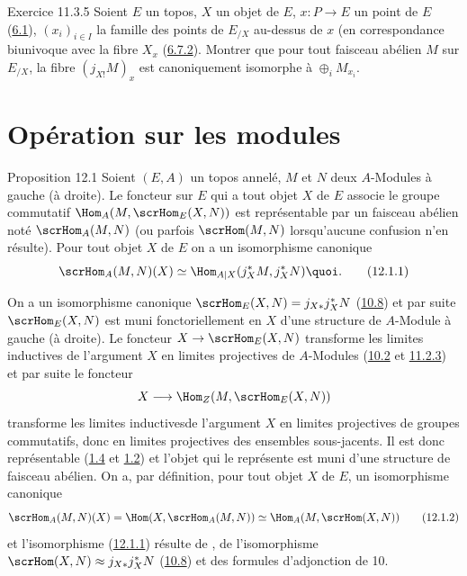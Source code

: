 \begin{enonce*}[remark]{Exercice 11.3.5}
Soient $E$ un topos, $X$ un objet de $E$, $x:P\rightarrow E$ un
point de $E$ (\hyperref[IV.def6.1]{6.1}), $(x_i)_{i\in I}$ la famille des
points de $E_{/X}$ au-dessus de $x$ (en correspondance biunivoque
avec la fibre $X_x$ (\hyperref[IV.eq6.7.2]{6.7.2}). Montrer que pour tout
faisceau abélien $M$ sur $E_{/X}$, la fibre $(j_{X!}M)_x$ est
canoniquement isomorphe à $\oplus_i M_{x_i}$.
\end{enonce*}

\section{Opération sur les modules}

\begin{enonce*}{Proposition 12.1}
Soient $(E,A)$ un topos annelé, $M$ et $N$ deux $A$-Modules à gauche
(\resp à droite). Le foncteur sur $E$ qui a tout objet $X$ de $E$
associe le groupe commutatif $\Hom_A(M,\scrHom_E(X,N))$ est
représentable par un faisceau abélien noté $\scrHom_A(M,N)$ (ou
parfois $\scrHom(M,N)$ lorsqu'aucune confusion n'en résulte). Pour
tout objet $X$ de $E$ on a un isomorphisme canonique
\begin{equation*}
\scrHom_A(M,N)(X)\simeq \Hom_{A| X}(j^{\ast}_XM,
j^{\ast}_XN){\quoi}.\tag{12.1.1}
\end{equation*}
\end{enonce*}

On a un isomorphisme canonique $\scrHom_E(X,N)=j_{X\ast}j^{\ast}_XN$
(\hyperref[IV.cor10.8]{10.8}) et par suite $\scrHom_E(X,N)$ est muni
fonctoriellement en $X$ d'une structure de $A$-Module à gauche
(\resp à droite). Le foncteur $X\rightarrow \scrHom_E(X,N)$
transforme les limites inductives de l'argument $X$ en limites
projectives de $A$-Modules (\hyperref[IV.subsec10.2]{10.2} et
\hyperref[IV.subsubsec11.2.3]{11.2.3}) et par suite le foncteur
$$
X\longrightarrow \Hom_Z(M,\scrHom_E(X,N))
$$
transforme les limites inductives\pageoriginale de l'argument $X$ en
limites projectives de groupes commutatifs, donc en limites
projectives des ensembles sous-jacents. Il est donc représentable
(\hyperref[IV.prop1.4]{1.4} et \hyperref[IV.theo1.2]{1.2}) et l'objet qui le représente
est muni d'une structure de faisceau abélien. On a, par définition,
pour tout objet $X$ de $E$, un isomorphisme canonique
\begin{equation*}
\scrHom_A(M,N)(X)=\Hom(X,\scrHom_A(M,N))\simeq
\Hom_A(M,\scrHom(X,N))\tag{12.1.2}
\end{equation*}
et l'isomorphisme (\hyperref[IV.eq12.1.1]{12.1.1}) résulte de , de
l'isomorphisme $\scrHom(X,N)\approx j_{X\ast}j^{\ast}_XN$
(\hyperref[IV.cor10.8]{10.8}) et des formules d'adjonction de 10.

